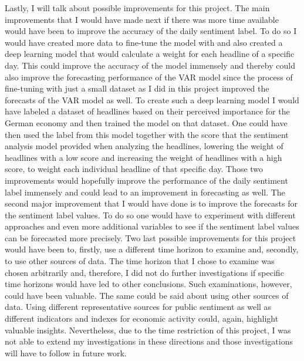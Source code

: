 \documentclass[11pt, a4paper, leqno]{article}
\begin{document}
Lastly, I will talk about possible improvements for this project.
The main improvements that I would have made next if there was more time available would have been to improve the accuracy of the daily sentiment label. To do so I would have created more data to fine-tune the model with and also created a deep learning model that would calculate a weight for each headline of a specific day. This could improve the accuracy of the model immensely and thereby could also improve the forecasting performance of the VAR model since the process of fine-tuning with just a small dataset as I did in this project improved the forecasts of the VAR model as well. To create such a deep learning model I would have labeled a dataset of headlines based on their perceived importance for the German economy and then trained the model on that dataset. One could have then used the label from this model together with the score that the sentiment analysis model provided when analyzing the headlines, lowering the weight of headlines with a low score and increasing the weight of headlines with a high score, to weight each individual headline of that specific day. Those two improvements would hopefully improve the performance of the daily sentiment label immensely and could lead to an improvement in forecasting as well.
The second major improvement that I would have done is to improve the forecasts for the sentiment label values. To do so one would have to experiment with different approaches and even more additional variables to see if the sentiment label values can be forecasted more precisely.
Two last possible improvements for this project would have been to, firstly, use a different time horizon to examine and, secondly, to use other sources of data. The time horizon that I chose to examine was chosen arbitrarily and, therefore, I did not do further investigations if specific time horizons would have led to other conclusions. Such examinations, however, could have been valuable. 
The same could be said about using other sources of data. Using different representative sources for public sentiment as well as different indicators and indexes for economic activity could, again, highlight valuable insights. Nevertheless, due to the time restriction of this project, I was not able to extend my investigations in these directions and those investigations will have to follow in future work.


\printbibliography
{}



\end{document}
